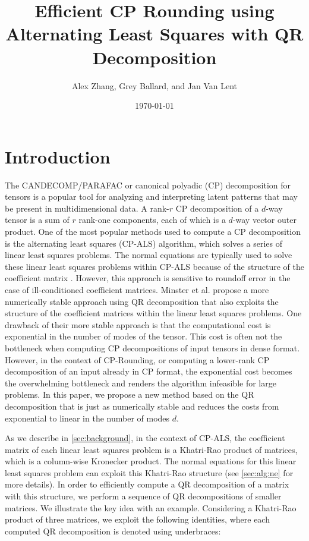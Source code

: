\documentclass{article}
\title{Efficient CP Rounding using Alternating Least Squares with QR Decomposition}
\author{Alex Zhang, Grey Ballard, and Jan Van Lent}
\date{\today}
\begin{document}
\maketitle

\section{Introduction}
The CANDECOMP/PARAFAC or canonical polyadic (CP) decomposition for tensors is a popular tool for analyzing and interpreting latent patterns that may be present in multidimensional data. 
A rank-$r$ CP decomposition of a $d$-way tensor is a sum of $r$ rank-one components, each of which is a $d$-way vector outer product.
One of the most popular methods used to compute a CP decomposition is the alternating least squares (CP-ALS) algorithm, which solves a series of linear least squares problems. 
The normal equations are typically used to solve these linear least squares problems within CP-ALS because of the structure of the coefficient matrix \cite{kolda2009tensor}. 
However, this approach is sensitive to roundoff error in the case of ill-conditioned coefficient matrices. 
Minster et al. \cite{MVLB23} propose a more numerically stable approach using QR decomposition that also exploits the structure of the coefficient matrices within the linear least squares problems.
One drawback of their more stable approach is that the computational cost is exponential in the number of modes of the tensor.
This cost is often not the bottleneck when computing CP decompositions of input tensors in dense format.
However, in the context of CP-Rounding, or computing a lower-rank CP decomposition of an input already in CP format, the exponential cost becomes the overwhelming bottleneck and renders the algorithm infeasible for large problems.
In this paper, we propose a new method based on the QR decomposition that is just as numerically stable and reduces the costs from exponential to linear in the number of modes $d$.


As we describe in \cref{sec:background}, in the context of CP-ALS, the coefficient matrix of each linear least squares problem is a Khatri-Rao product of matrices, which is a column-wise Kronecker product.
The normal equations for this linear least squares problem can exploit this Khatri-Rao structure (see \cref{sec:alg:ne} for more details).
In order to efficiently compute a QR decomposition of a matrix with this structure, we perform a sequence of QR decompositions of smaller matrices.
We illustrate the key idea with an example.
Considering a Khatri-Rao product of three matrices, we exploit the following identities, where each computed QR decomposition is denoted using underbraces:
\end{document}
